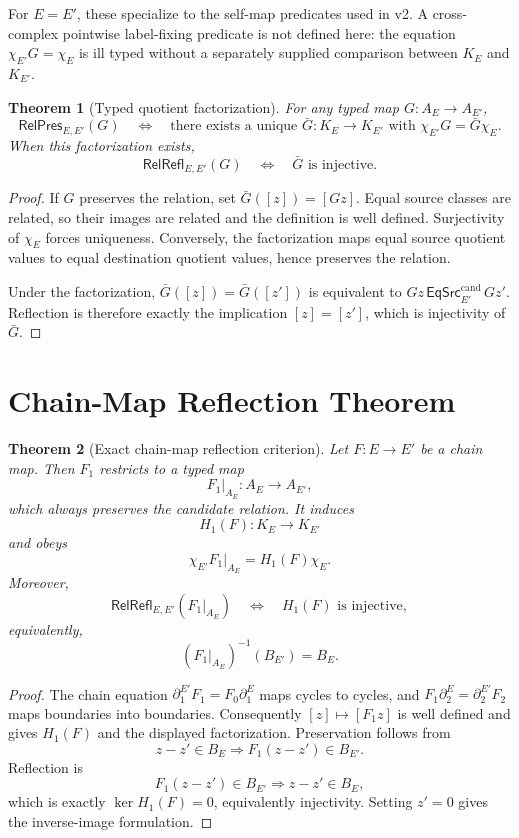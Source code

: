 \documentclass[11pt]{article}
\newtheorem{theorem}{Theorem}
\newcommand{\EqCand}{\mathsf{EqSrc}^{\mathrm{cand}}}
\newcommand{\RelPres}{\mathsf{RelPres}}
\newcommand{\RelRefl}{\mathsf{RelRefl}}
\begin{document}
For \(E=E'\), these specialize to the self-map predicates used in v2. A
cross-complex pointwise label-fixing predicate is not defined here: the
equation \(\chi_{E'}G=\chi_E\) is ill typed without a separately supplied
comparison between \(K_E\) and \(K_{E'}\).

\begin{theorem}[Typed quotient factorization]
For any typed map \(G:A_E\to A_{E'}\),
\[
\RelPres_{E,E'}(G)
\quad\Longleftrightarrow\quad
\text{there exists a unique }\bar G:K_E\to K_{E'}
\text{ with }\chi_{E'}G=\bar G\chi_E.
\]
When this factorization exists,
\[
\RelRefl_{E,E'}(G)
\quad\Longleftrightarrow\quad
\bar G\text{ is injective}.
\]
\end{theorem}

\begin{proof}
If \(G\) preserves the relation, set
\(\bar G([z])=[Gz]\). Equal source classes are related, so their images are
related and the definition is well defined. Surjectivity of \(\chi_E\)
forces uniqueness. Conversely, the factorization maps equal source quotient
values to equal destination quotient values, hence preserves the relation.

Under the factorization,
\(\bar G([z])=\bar G([z'])\) is equivalent to
\(Gz\,\EqCand_{E'}\,Gz'\). Reflection is therefore exactly the implication
\([z]=[z']\), which is injectivity of \(\bar G\).
\end{proof}

\section{Chain-Map Reflection Theorem}

\begin{theorem}[Exact chain-map reflection criterion]
Let \(F:E\to E'\) be a chain map. Then \(F_1\) restricts to a typed map
\[
F_1|_{A_E}:A_E\longrightarrow A_{E'},
\]
which always preserves the candidate relation. It induces
\[
H_1(F):K_E\longrightarrow K_{E'}
\]
and obeys
\[
\chi_{E'}F_1|_{A_E}=H_1(F)\chi_E.
\]
Moreover,
\[
\RelRefl_{E,E'}(F_1|_{A_E})
\quad\Longleftrightarrow\quad
H_1(F)\text{ is injective},
\]
equivalently,
\[
(F_1|_{A_E})^{-1}(B_{E'})=B_E.
\]
\end{theorem}

\begin{proof}
The chain equation
\(\partial_1^{E'}F_1=F_0\partial_1^E\) maps cycles to cycles, and
\(F_1\partial_2^E=\partial_2^{E'}F_2\) maps boundaries into boundaries.
Consequently \([z]\mapsto[F_1z]\) is well defined and gives \(H_1(F)\) and
the displayed factorization. Preservation follows from
\[
z-z'\in B_E\Longrightarrow F_1(z-z')\in B_{E'}.
\]
Reflection is
\[
F_1(z-z')\in B_{E'}\Longrightarrow z-z'\in B_E,
\]
which is exactly \(\ker H_1(F)=0\), equivalently injectivity. Setting
\(z'=0\) gives the inverse-image formulation.
\end{proof}
\end{document}
